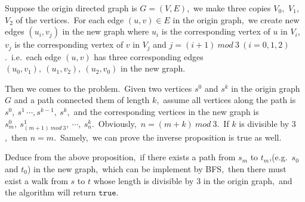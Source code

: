 \documentclass[]{article}
\begin{document}
	Suppose the origin directed graph is $G = (V,E)$,\ we make three copies $V_0$,\ $V_1$,\ $V_2$ of the vertices.\ For each edge $(u,v)\in E$ in the origin graph,\ we create new edges $(u_i,v_j)$ in the new graph where $u_i$ is the corresponding vertex of $u$ in $V_i$,\ $v_j$ is the corresponding vertex of $v$ in $V_j$ and $j = (i+1)\ mod\ 3\ (i=0,1,2)$.\ i.e.\ each edge $(u,v)$ has three corresponding edges $(u_0,v_1),\ (u_1,v_2),\ (u_2,v_0)$ in the new graph.
 
 	Then we comes to the problem.\ Given two vertices $s^0$ and $s^k$ in the origin graph $G$ and a path connected them of length $k$,\ assume all vertices along the path is $s^0,\ s^1\, \cdots, s^{k-1},\ s^k$,\ and the corresponding vertices in the new graph is $s^0_m,\ s^1_{(m+1)\ mod\ 3},\ \cdots,\ s^k_n$.\ Obviously,\ $n = (m+k)\ mod\ 3$.\ If $k$ is divisible by $3$,\ then $n = m$.\ Samely,\ we can prove the inverse proposition is true as well.
 	
 	Deduce from the above proposition,\ if there exists a path from $s_m$ to $t_m$,(e.g.\ $s_0$ and $t_0$) in the new graph,\ which can be implement by BFS,\ then there must exist a walk from $s$ to $t$ whose length is divisible by $3$ in the origin graph,\ and the algorithm will return $\mathtt{true}$.
	
	
\end{document}
